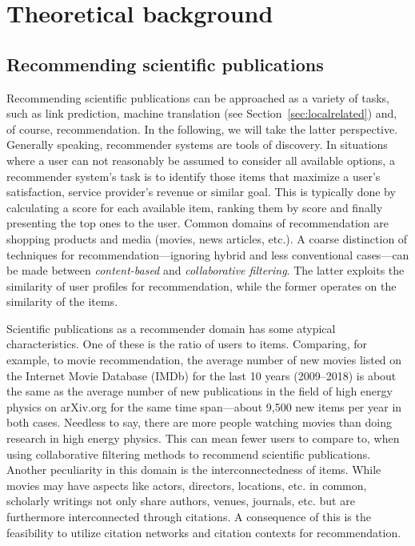 \section{Theoretical background}
\subsection{Recommending scientific publications}\label{sec:backgroundrecpub}
Recommending scientific publications can be approached as a variety of tasks, such as link prediction, machine translation (see Section~\ref{sec:localrelated}) and, of course, recommendation. In the following, we will take the latter perspective. Generally speaking, recommender systems are tools of discovery. In situations where a user can not reasonably be assumed to consider all available options, a recommender system's task is to identify those items that maximize a user's satisfaction, service provider's revenue or similar goal. This is typically done by calculating a score for each available item, ranking them by score and finally presenting the top ones to the user. Common domains of recommendation are shopping products and media (movies, news articles, etc.). A coarse distinction of techniques for recommendation---ignoring hybrid and less conventional cases---can be made between \emph{content-based} and \emph{collaborative filtering}. The latter exploits the similarity of user profiles for recommendation, while the former operates on the similarity of the items.~\cite{Ricci2015}

Scientific publications as a recommender domain has some atypical characteristics. One of these is the ratio of users to items. Comparing, for example, to movie recommendation, the average number of new movies listed on the Internet Movie Database (IMDb) for the last 10 years (2009--2018) is about the same as the average number of new publications in the field of high energy physics on arXiv.org for the same time span---about 9,500 new items per year in both cases. Needless to say, there are more people watching movies than doing research in high energy physics. This can mean fewer users to compare to, when using collaborative filtering methods to recommend scientific publications. Another peculiarity in this domain is the interconnectedness of items. While movies may have aspects like actors, directors, locations, etc. in common, scholarly writings not only share authors, venues, journals, etc. but are furthermore interconnected through citations. A consequence of this is the feasibility to utilize citation networks and citation contexts for recommendation.

